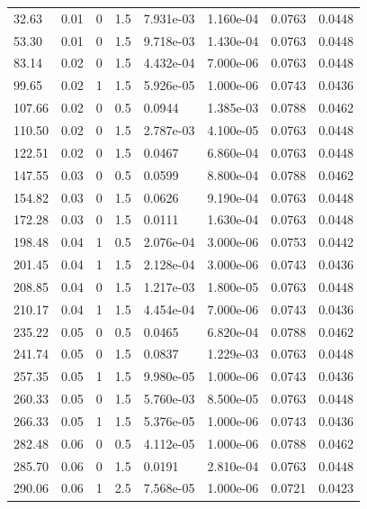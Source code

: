 \documentclass[preview]{standalone}
\begin{document}
{{\begin{tabular}{L{1.2cm}C{1.2cm} C{0.3cm}C{0.5cm} C{1.4cm}C{1.4cm} C{1.4cm}C{1.4cm}}
  32.63  &  0.01  & 0     & 1.5 &  7.931e-03  & 1.160e-04  & 0.0763 &  0.0448   \\ 
  53.30  &  0.01  & 0     & 1.5 &  9.718e-03  & 1.430e-04  & 0.0763 &  0.0448   \\ 
  83.14  &  0.02  & 0     & 1.5 &  4.432e-04  & 7.000e-06  & 0.0763 &  0.0448   \\ 
  99.65  &  0.02  & 1     & 1.5 &  5.926e-05  & 1.000e-06  & 0.0743 &  0.0436   \\ 
  107.66  &  0.02  & 0     & 0.5 &  0.0944  & 1.385e-03  & 0.0788 &  0.0462   \\ 
  110.50  &  0.02  & 0     & 1.5 &  2.787e-03  & 4.100e-05  & 0.0763 &  0.0448   \\ 
  122.51  &  0.02  & 0     & 1.5 &  0.0467  & 6.860e-04  & 0.0763 &  0.0448   \\ 
  147.55  &  0.03  & 0     & 0.5 &  0.0599  & 8.800e-04  & 0.0788 &  0.0462   \\ 
  154.82  &  0.03  & 0     & 1.5 &  0.0626  & 9.190e-04  & 0.0763 &  0.0448   \\ 
  172.28  &  0.03  & 0     & 1.5 &  0.0111  & 1.630e-04  & 0.0763 &  0.0448   \\ 
  198.48  &  0.04  & 1     & 0.5 &  2.076e-04  & 3.000e-06  & 0.0753 &  0.0442   \\ 
  201.45  &  0.04  & 1     & 1.5 &  2.128e-04  & 3.000e-06  & 0.0743 &  0.0436   \\ 
  208.85  &  0.04  & 0     & 1.5 &  1.217e-03  & 1.800e-05  & 0.0763 &  0.0448   \\ 
  210.17  &  0.04  & 1     & 1.5 &  4.454e-04  & 7.000e-06  & 0.0743 &  0.0436   \\ 
  235.22  &  0.05  & 0     & 0.5 &  0.0465  & 6.820e-04  & 0.0788 &  0.0462   \\ 
  241.74  &  0.05  & 0     & 1.5 &  0.0837  & 1.229e-03  & 0.0763 &  0.0448   \\ 
  257.35  &  0.05  & 1     & 1.5 &  9.980e-05  & 1.000e-06  & 0.0743 &  0.0436   \\ 
  260.33  &  0.05  & 0     & 1.5 &  5.760e-03  & 8.500e-05  & 0.0763 &  0.0448   \\ 
  266.33  &  0.05  & 1     & 1.5 &  5.376e-05  & 1.000e-06  & 0.0743 &  0.0436   \\ 
  282.48  &  0.06  & 0     & 0.5 &  4.112e-05  & 1.000e-06  & 0.0788 &  0.0462   \\ 
  285.70  &  0.06  & 0     & 1.5 &  0.0191  & 2.810e-04  & 0.0763 &  0.0448   \\ 
  290.06  &  0.06  & 1     & 2.5 &  7.568e-05  & 1.000e-06  & 0.0721 &  0.0423   \\ 

\end{tabular}}}
\end{document}
